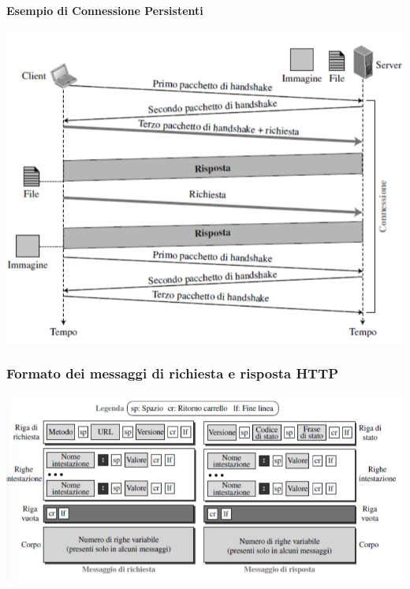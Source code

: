 \documentclass[12pt]{report}
\begin{document}
	\paragraph{Esempio di Connessione Persistenti}
	\begin{center}
		\includegraphics[scale=0.5]{assets/persistent.png}
	\end{center}
	
	\subsubsection{Formato dei messaggi di richiesta e risposta HTTP}
	\begin{center}
		\includegraphics[scale=0.5]{assets/http-msg.png}
	\end{center}
\end{document}
